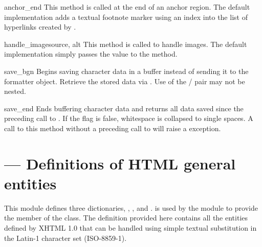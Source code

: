 \begin{methoddesc}{anchor_end}{}
This method is called at the end of an anchor region.  The default
implementation adds a textual footnote marker using an index into the
list of hyperlinks created by .
\end{methoddesc}

\begin{methoddesc}{handle_image}{source, alt}
This method is called to handle images.  The default implementation
simply passes the  value to the 
method.
\end{methoddesc}

\begin{methoddesc}{save_bgn}{}
Begins saving character data in a buffer instead of sending it to the
formatter object.  Retrieve the stored data via .
Use of the  /  pair may not be
nested.
\end{methoddesc}

\begin{methoddesc}{save_end}{}
Ends buffering character data and returns all data saved since the
preceding call to .  If the  flag is
false, whitespace is collapsed to single spaces.  A call to this
method without a preceding call to  will raise a
 exception.
\end{methoddesc}



\section{ ---
         Definitions of HTML general entities}


This module defines three dictionaries, ,
, and .  is
used by the  module to provide the
 member of the  class.  The
definition provided here contains all the entities defined by XHTML 1.0 
that can be handled using simple textual substitution in the Latin-1
character set (ISO-8859-1).


